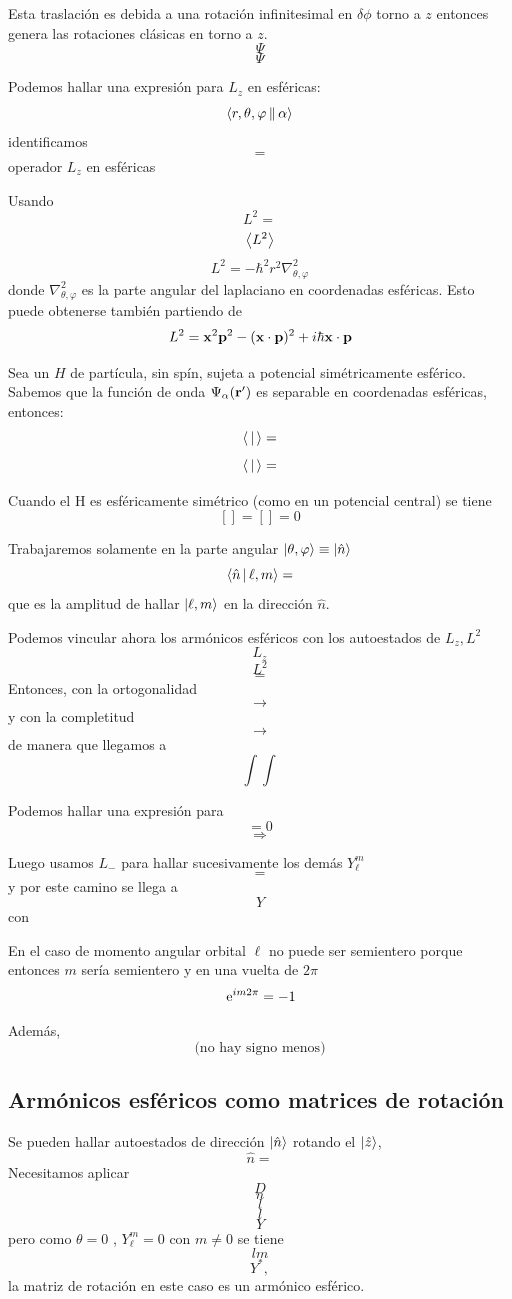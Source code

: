 \documentclass[10pt,oneside]{CBFT_book}
\begin{document}
Esta traslación es debida a una rotación infinitesimal en $\delta\phi$ torno a $z$ entonces genera las 
rotaciones clásicas en torno a $z$.
\[
	\Psi 
\]
\[
	\Psi
\]

Podemos hallar una expresión para $L_z$ en esféricas:
\[
	\Braket{r,\theta,\varphi||\alpha}
\]
identificamos 
\[
	= 
\]
operador $L_z$ en esféricas

Usando 
\[
	L^2 = 
\]
\[
	\Braket{L^2}
\]
\[
	L^2 = -\hbar^2 r^2 \nabla^2_{\theta,\varphi}
\]
donde $\nabla^2_{\theta,\varphi}$ es la parte angular del laplaciano en coordenadas esféricas.
Esto puede obtenerse también partiendo de 
\[
	L^2 = \vb{x}^2\vb{p}^2 - (\vb{x}\cdot\vb{p})^2 + i\hbar \vb{x}\cdot\vb{p}
\]

Sea un $H$ de partícula, sin spín, sujeta a potencial simétricamente esférico. Sabemos que la función de onda 
$\Psi_\alpha(\vb{r}')$ es separable en coordenadas esféricas, entonces:
\[
	\Braket{|} = 
\]
\[
	\Braket{|} = 
\]

Cuando el H es esféricamente simétrico (como en un potencial central) se tiene 
\[
	[] = [] = 0
\]

Trabajaremos solamente en la parte angular  $\Ket{\theta,\varphi} \equiv \Ket{\hat{n}}$
\[
	\Braket{\hat{n}|\ell,m} =
\]
que es la amplitud de hallar $\Ket{\ell,m}$ en la dirección $\hat{n}$.

Podemos vincular ahora los armónicos esféricos con los autoestados de $L_z,L^2$
\[
	L_z
\]
\[
	L^2
\]
\[
	=
\]
Entonces, con la ortogonalidad
\[
	\longrightarrow
\]
y con la completitud 
\[
	\longrightarrow
\]
de manera que llegamos a 
\[
	\int \int 
\]

Podemos hallar una expresión para 
\[
	= 0
\]
\[
	\Rightarrow
\]

Luego usamos $L_-$ para hallar sucesivamente los demás $Y^m_\ell$
\[
	=
\]
y por este camino se llega a 
\[
	Y
\]
con 
\[
	\qquad 
\]

En el caso de momento angular orbital $\ell$ no puede ser semientero porque entonces $m$ sería semientero y 
en una vuelta de $2\pi$
\[
	\:\mathrm{e}^{im2\pi} = -1
\]	

Además,
\[
	\text{(no hay signo menos)}
\]

\subsection{Armónicos esféricos como matrices de rotación}

Se pueden hallar autoestados de dirección $\Ket{\hat{n}}$ rotando el $\Ket{\hat{z}}$,
\[
	\hat{n} = 
\]
Necesitamos aplicar 
\[
	D
\]
\[
	n
\]
\[
	l
\]
\[
	l
\]
\[
	Y
\]
pero como $\theta=0$ , $Y_\ell^m = 0$  con $m\neq 0$ se tiene 
\[
	lm
\]
\[
	Y^*,
\]
la matriz de rotación en este caso es un armónico esférico.
\end{document}
